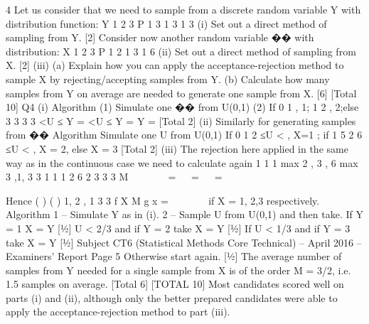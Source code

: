 \documentclass[a4paper,12pt]{article}
\begin{document}
4 Let us consider that we need to sample from a discrete random variable Y with
distribution function:
  Y 1 2 3
P 1
3 1
3 1
3
(i) Set out a direct method of sampling from Y. [2]
Consider now another random variable �� with distribution:
  X 1 2 3
P 1
2 1
3 1
6
(ii) Set out a direct method of sampling from X. [2]
(iii) (a) Explain how you can apply the acceptance-rejection method to
sample X by rejecting/accepting samples from Y.
(b) Calculate how many samples from Y on average are needed to
generate one sample from X. [6]
[Total 10]
Q4 (i) Algorithm
(1) Simulate one �� from U(0,1) 
(2) If 0 1 , 1; 1 2 , 2;else 3
3 3 3
<U ≤ Y = <U ≤ Y = Y = 
[Total 2]
(ii) Similarly for generating samples from ��
Algorithm
Simulate one U from U(0,1) 
If 0 1
2
≤U < , X=1 ; if 1 5
2 6
≤U < , X = 2, else X = 3 
[Total 2]
(iii) The rejection here applied in the same way as in the continuous case we need
to calculate again
1 1 1
max 2 , 3 , 6 max 3 ,1, 3 3 1 1 1 2 6 2
3 3 3
M
 
    =   =   =
     
 

Hence ( )
( )
1, 2 , 1
3 3
f X
M g x
=    
 
if X = 1, 2,3 respectively. 
Algorithm
1 – Simulate Y as in (i). 
2 – Sample U from U(0,1) and then take.
If Y = 1 X = Y [½]
U < 2/3 and if Y = 2 take X = Y [½]
If U < 1/3 and if Y = 3 take X = Y [½]
Subject CT6 (Statistical Methods Core Technical) – April 2016 – Examiners’ Report
Page 5
Otherwise start again. [½]
The average number of samples from Y needed for a single sample from X is
of the order M = 3/2, i.e. 1.5 samples on average. 
[Total 6]
[TOTAL 10]
Most candidates scored well on parts (i) and (ii), although only the better
prepared candidates were able to apply the acceptance-rejection method to
part (iii).
\end{document}
